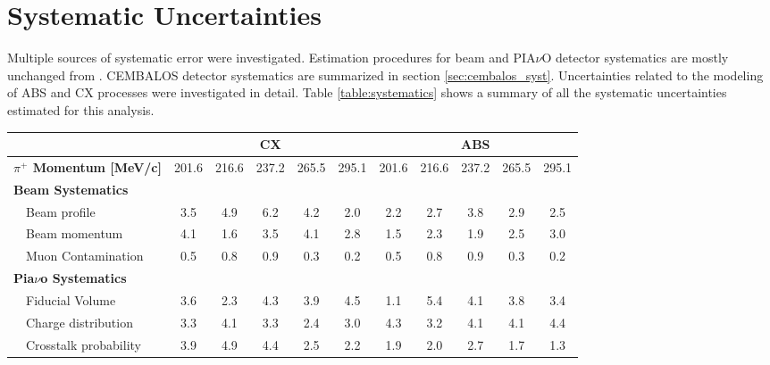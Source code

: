 \section{\label{sec:uncertainties}Systematic Uncertainties}
Multiple sources of systematic error were investigated. Estimation procedures for beam and PIA$\nu$O detector systematics are mostly unchanged from \cite{duet}. CEMBALOS detector systematics are summarized in section \ref{sec:cembalos_syst}. Uncertainties related to the modeling of ABS and CX processes were investigated in detail. Table \ref{table:systematics} shows a summary of all the systematic uncertainties estimated for this analysis.

\begin{table}[htbp]
\begin{center}
\begin{tabular*}{\textwidth}{l|@{\extracolsep{\fill}}ccccc|ccccc}
\hline\hline
& \multicolumn{5}{c}{CX} & \multicolumn{5}{c}{ABS} \\
\hline
{\bfseries$\pi^+$ Momentum [MeV/c]}& 201.6 & 216.6 & 237.2 & 265.5 & 295.1 & 201.6 & 216.6 & 237.2 & 265.5 & 295.1 \\
\hline
  {\bfseries Beam Systematics} & & & & &  & & & & &\\
  ~~Beam profile& 3.5& 4.9& 6.2& 4.2& 2.0& 2.2& 2.7& 3.8& 2.9& 2.5 \\
  ~~Beam momentum& 4.1& 1.6& 3.5& 4.1& 2.8& 1.5& 2.3& 1.9& 2.5& 3.0 \\
  ~~Muon Contamination& 0.5& 0.8& 0.9& 0.3& 0.2& 0.5& 0.8& 0.9& 0.3& 0.2 \\
  \hline
  {\bfseries Pia$\nu$o Systematics} & & & & &  & & & & &\\
  ~~Fiducial Volume& 3.6& 2.3& 4.3& 3.9& 4.5& 1.1& 5.4& 4.1& 3.8& 3.4 \\
  ~~Charge distribution& 3.3& 4.1& 3.3& 2.4& 3.0& 4.3& 3.2& 4.1& 4.1& 4.4 \\
  ~~Crosstalk probability& 3.9& 4.9& 4.4& 2.5& 2.2& 1.9& 2.0& 2.7& 1.7& 1.3 \\

\end{tabular*}
\end{center}
\end{table}
